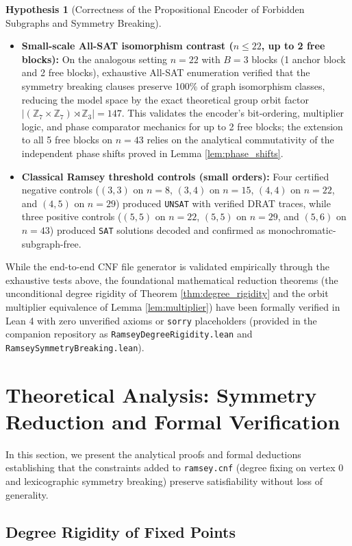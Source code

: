 \documentclass[11pt,a4paper]{article}
\theoremstyle{definition}
\newtheorem{hypothesis}{Hypothesis}
\begin{document}
\begin{hypothesis}[Correctness of the Propositional Encoder of Forbidden Subgraphs and Symmetry Breaking]
\begin{itemize}
    \item \textbf{Small-scale All-SAT isomorphism contrast ($n \le 22$, up to 2 free blocks):} On the analogous setting $n=22$ with $B=3$ blocks (1 anchor block and 2 free blocks), exhaustive All-SAT enumeration verified that the symmetry breaking clauses preserve 100\% of graph isomorphism classes, reducing the model space by the exact theoretical group orbit factor $|(\mathbb{Z}_7 \times \mathbb{Z}_7) \rtimes \mathbb{Z}_3| = 147$. This validates the encoder's bit-ordering, multiplier logic, and phase comparator mechanics for up to 2 free blocks; the extension to all 5 free blocks on $n=43$ relies on the analytical commutativity of the independent phase shifts proved in Lemma \ref{lem:phase_shifts}.
    \item \textbf{Classical Ramsey threshold controls (small orders):} Four certified negative controls ($(3,3)$ on $n=8$, $(3,4)$ on $n=15$, $(4,4)$ on $n=22$, and $(4,5)$ on $n=29$) produced \texttt{UNSAT} with verified DRAT traces, while three positive controls ($(5,5)$ on $n=22$, $(5,5)$ on $n=29$, and $(5,6)$ on $n=43$) produced \texttt{SAT} solutions decoded and confirmed as monochromatic-subgraph-free.
\end{itemize}
While the end-to-end CNF file generator is validated empirically through the exhaustive tests above, the foundational mathematical reduction theorems (the unconditional degree rigidity of Theorem \ref{thm:degree_rigidity} and the orbit multiplier equivalence of Lemma \ref{lem:multiplier}) have been formally verified in Lean 4 with zero unverified axioms or \texttt{sorry} placeholders (provided in the companion repository as \texttt{RamseyDegreeRigidity.lean} and \texttt{RamseySymmetryBreaking.lean}).
\end{hypothesis}

\section{Theoretical Analysis: Symmetry Reduction and Formal Verification}
\label{sec:theory}

In this section, we present the analytical proofs and formal deductions establishing that the constraints added to \texttt{ramsey.cnf} (degree fixing on vertex 0 and lexicographic symmetry breaking) preserve satisfiability without loss of generality.

\subsection{Degree Rigidity of Fixed Points}
\end{document}
